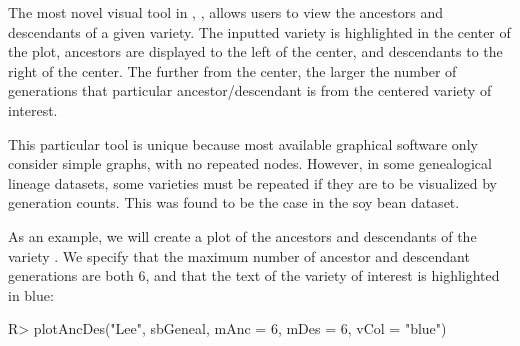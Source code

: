 \documentclass[article,shortnames]{jss}
\begin{document}
The most novel visual tool in , , allows users to view the ancestors and descendants of a given variety. The inputted variety is highlighted in the center of the plot, ancestors are displayed to the left of the center, and descendants to the right of the center. The further from the center, the larger the number of generations that particular ancestor/descendant is from the centered variety of interest.

This particular  tool is unique because most available graphical software only consider simple graphs, with no repeated nodes. However, in some genealogical lineage datasets, some varieties must be repeated if they are to be visualized by generation counts. This was found to be the case in the soy bean dataset.

As an example, we will create a plot of the ancestors and descendants of the variety . We specify that the maximum number of ancestor and descendant generations are both 6, and that the text of the variety of interest is highlighted in blue:

\begin{Code}
R> plotAncDes("Lee", sbGeneal, mAnc = 6, mDes = 6, vCol = "blue")
\end{Code}
\end{document}

